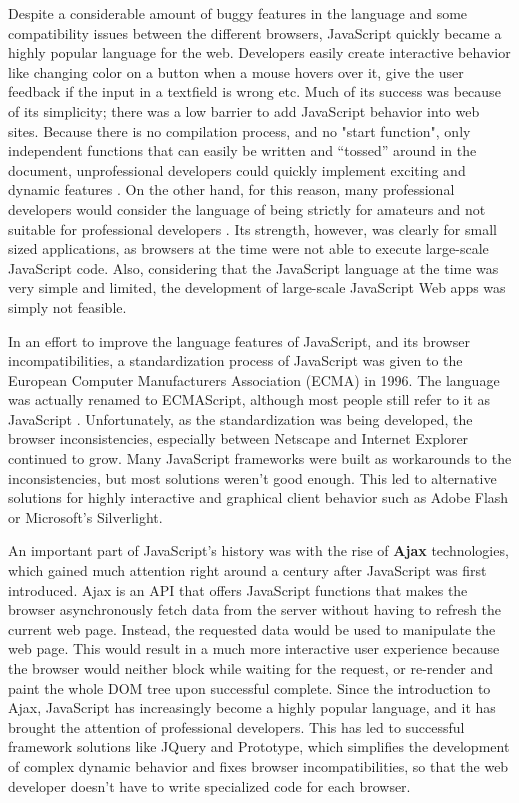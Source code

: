 Despite a considerable amount of buggy features in the language and some compatibility issues between the different browsers, JavaScript quickly became a highly popular language for the web. Developers easily create interactive behavior like changing color on a button when a mouse hovers over it, give the user feedback if the input in a textfield is wrong etc. Much of its success was because of its simplicity; there was a low barrier to add JavaScript behavior into web sites. Because there is no compilation process, and no "start function", only independent functions that can easily be written and ``tossed'' around in the document, unprofessional developers could quickly implement exciting and dynamic features \cite{jsHowGotHere}. On the other hand, for this reason, many professional developers would consider the language of being strictly for amateurs and not suitable for professional developers \cite{UnderstoodJs}.  Its strength, however, was clearly for small sized applications, as browsers at the time were not able to execute large-scale JavaScript code. Also, considering that the JavaScript language at the time was very simple and limited, the development of large-scale JavaScript Web apps was simply not feasible. 
 
In an effort to improve the language features of JavaScript, and its browser incompatibilities, a standardization process of JavaScript was given to the European Computer Manufacturers Association (ECMA) in 1996. The language was actually renamed to ECMAScript, although most people still refer to it as JavaScript \cite{jsHist}. Unfortunately, as the standardization was being developed, the browser inconsistencies, especially between Netscape and Internet Explorer continued to grow. Many JavaScript frameworks were built as workarounds to the inconsistencies, but most solutions weren't good enough. This led to alternative solutions for highly interactive and graphical client behavior such as Adobe Flash or Microsoft's Silverlight. \cite{silverlight} 

An important part of JavaScript's history was with the rise of \textbf{Ajax} technologies,\cite{ajax} which gained much attention right around a century after JavaScript was first introduced. Ajax is an API that offers JavaScript functions that makes the browser asynchronously fetch data from the server without having to refresh the current web page. Instead, the requested data would be used to manipulate the web page. This would result in a much more interactive user experience because the browser would neither block while waiting for the request, or re-render and paint the whole DOM tree upon successful complete. Since the introduction to Ajax, JavaScript has increasingly become a highly popular language, and it has brought the attention of professional developers. This has led to successful framework solutions like JQuery\cite{jquery} and Prototype,\cite{prototype} which simplifies the development of complex dynamic behavior and fixes browser incompatibilities, so that the web developer doesn't have to write specialized code for each browser.


